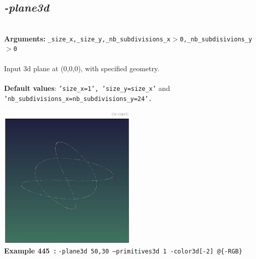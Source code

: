 \documentclass[a4paper,11pt,twoside]{book}
\begin{document}
\subsection{\emph{-plane3d} }\vspace*{-0.5em}
~\\\textbf{Arguments: } 
{\small \texttt{\_size\_x,\_size\_y,\_nb\_subdivisions\_x$>$0,\_nb\_subdisivions\_y$>$0}}\\~\\
Input 3d plane at (0,0,0), with specified geometry.
~\\~\\\textbf{Default values}: {\small \texttt{'size\_x=1', 'size\_y=size\_x'} and \texttt{'nb\_subdivisions\_x=nb\_subdivisions\_y=24'.}}
\begin{center}\includegraphics[keepaspectratio=true,height=7cm,width=\textwidth]{img/gmic_def445.jpg}\\
{\footnotesize \textbf{Example 445~:} \texttt{-plane3d 50,30 --primitives3d 1 -color3d[-2] @\{-RGB\}}}
\end{center}
\end{document}
